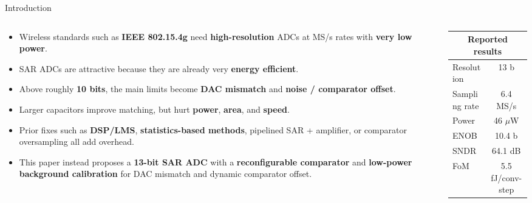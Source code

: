 \documentclass[aspectratio=169]{beamer}
\begin{document}
\begin{frame}{Introduction}
  \begin{columns}[T]
    \begin{column}{0.62\textwidth}
      \scriptsize
      \begin{itemize}
        \item Wireless standards such as \textbf{IEEE 802.15.4g} need \textbf{high-resolution} ADCs at MS/s rates with \textbf{very low power}.
        \item SAR ADCs are attractive because they are already very \textbf{energy efficient}.
        \item Above roughly \textbf{10 bits}, the main limits become \textbf{DAC mismatch} and \textbf{noise / comparator offset}.
        \item Larger capacitors improve matching, but hurt \textbf{power}, \textbf{area}, and \textbf{speed}.
        \item Prior fixes such as \textbf{DSP/LMS}, \textbf{statistics-based methods}, pipelined SAR + amplifier, or comparator oversampling all add overhead.
        \item This paper instead proposes a \textbf{13-bit SAR ADC} with a \textbf{reconfigurable comparator} and \textbf{low-power background calibration} for DAC mismatch and dynamic comparator offset.
      \end{itemize}
    \end{column}
    \begin{column}{0.38\textwidth}
      \centering
      \scriptsize
      \begin{tabular}{|l|c|}
        \hline
        \multicolumn{2}{|c|}{\textbf{Reported results}} \\
        \hline
        Resolution & 13 b \\
        \hline
        Sampling rate & 6.4 MS/s \\
        \hline
        Power & 46 $\mu$W \\
        \hline
        ENOB & 10.4 b \\
        \hline
        SNDR & 64.1 dB \\
        \hline
        FoM & 5.5 fJ/conv-step \\
        \hline
      \end{tabular}
    \end{column}
  \end{columns}
\end{frame}
\end{document}
